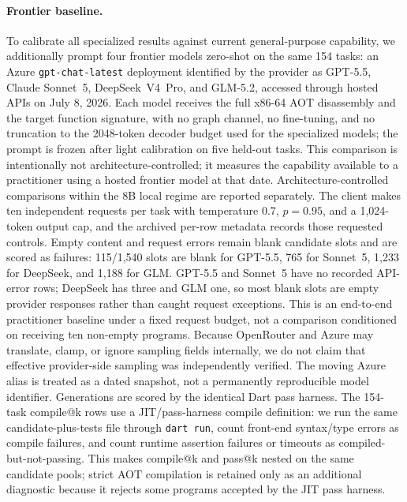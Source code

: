 \documentclass[11pt]{article}
\begin{document}
\paragraph{Frontier baseline.} To calibrate all specialized results against current general-purpose capability, we additionally prompt four frontier models zero-shot on the same 154 tasks: an Azure \texttt{gpt-chat-latest} deployment identified by the provider as GPT-5.5, Claude Sonnet~5, DeepSeek~V4~Pro, and GLM-5.2, accessed through hosted APIs on July 8, 2026. Each model receives the full x86-64 AOT disassembly and the target function signature, with no graph channel, no fine-tuning, and no truncation to the 2048-token decoder budget used for the specialized models; the prompt is frozen after light calibration on five held-out tasks. This comparison is intentionally not architecture-controlled; it measures the capability available to a practitioner using a hosted frontier model at that date. Architecture-controlled comparisons within the 8B local regime are reported separately. The client makes ten independent requests per task with temperature 0.7, \(p=0.95\), and a 1{,}024-token output cap, and the archived per-row metadata records those requested controls. Empty content and request errors remain blank candidate slots and are scored as failures: 115/1{,}540 slots are blank for GPT-5.5, 765 for Sonnet~5, 1{,}233 for DeepSeek, and 1{,}188 for GLM. GPT-5.5 and Sonnet~5 have no recorded API-error rows; DeepSeek has three and GLM one, so most blank slots are empty provider responses rather than caught request exceptions. This is an end-to-end practitioner baseline under a fixed request budget, not a comparison conditioned on receiving ten non-empty programs. Because OpenRouter and Azure may translate, clamp, or ignore sampling fields internally, we do not claim that effective provider-side sampling was independently verified. The moving Azure alias is treated as a dated snapshot, not a permanently reproducible model identifier. Generations are scored by the identical Dart pass harness. The 154-task compile@k rows use a JIT/pass-harness compile definition: we run the same candidate-plus-tests file through \texttt{dart run}, count front-end syntax/type errors as compile failures, and count runtime assertion failures or timeouts as compiled-but-not-passing. This makes compile@k and pass@k nested on the same candidate pools; strict AOT compilation is retained only as an additional diagnostic because it rejects some programs accepted by the JIT pass harness.
\end{document}
